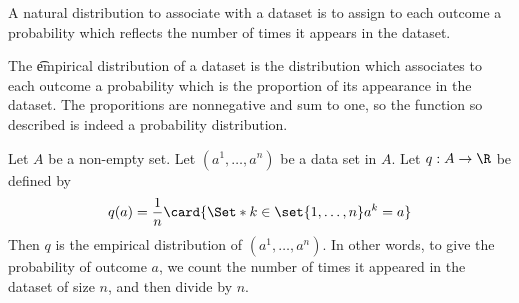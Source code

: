 

A natural distribution to associate with a dataset is to assign to each outcome a probability which reflects the number of times it appears in the dataset.


The \t{empirical distribution} of a dataset is the distribution which associates to each outcome a probability which is the proportion of its appearance in the dataset.
The proporitions are nonnegative and sum to one, so the function so described is indeed a probability distribution.


Let $A$ be a non-empty set.
Let $(a^1, \dots, a^n)$ be a data set in $A$.
Let $q: A \to \R$ be defined by
$$
  q(a) = \frac{1}{n} \card{\Set*{k \in \set{1, \dots, n}}{a^k = a}}
$$
Then $q$ is the empirical distribution of $(a^1, \dots, a^n)$.
In other words, to give the probability of outcome $a$, we count the number of times it appeared in the dataset of size $n$, and then divide by $n$.
